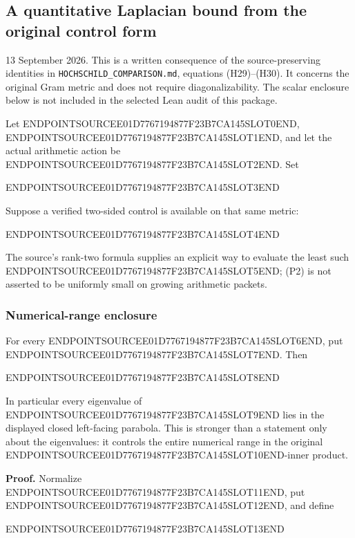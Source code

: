 \subsection{A quantitative Laplacian bound from the original control form}\label{endpoint-cc_laplacian--a-quantitative-laplacian-bound-from-the-original-control-form}

13 September 2026. This is a written consequence of the source-preserving identities in \texttt{HOCHSCHILD\_COMPARISON.md}, equations (H29)--(H30). It concerns the original Gram metric and does not require diagonalizability. The scalar enclosure below is not included in the selected Lean audit of this package.

Let ENDPOINTSOURCEE01D7767194877F23B7CA145SLOT0END, ENDPOINTSOURCEE01D7767194877F23B7CA145SLOT1END, and let the actual arithmetic action be ENDPOINTSOURCEE01D7767194877F23B7CA145SLOT2END. Set

ENDPOINTSOURCEE01D7767194877F23B7CA145SLOT3END

Suppose a verified two-sided control is available on that same metric:

ENDPOINTSOURCEE01D7767194877F23B7CA145SLOT4END

The source's rank-two formula supplies an explicit way to evaluate the least such ENDPOINTSOURCEE01D7767194877F23B7CA145SLOT5END; (P2) is not asserted to be uniformly small on growing arithmetic packets.

\subsubsection{Numerical-range enclosure}\label{endpoint-cc_laplacian--numerical-range-enclosure}

For every ENDPOINTSOURCEE01D7767194877F23B7CA145SLOT6END, put ENDPOINTSOURCEE01D7767194877F23B7CA145SLOT7END. Then

ENDPOINTSOURCEE01D7767194877F23B7CA145SLOT8END

In particular every eigenvalue of ENDPOINTSOURCEE01D7767194877F23B7CA145SLOT9END lies in the displayed closed left-facing parabola. This is stronger than a statement only about the eigenvalues: it controls the entire numerical range in the original ENDPOINTSOURCEE01D7767194877F23B7CA145SLOT10END-inner product.

\textbf{Proof.} Normalize ENDPOINTSOURCEE01D7767194877F23B7CA145SLOT11END, put ENDPOINTSOURCEE01D7767194877F23B7CA145SLOT12END, and define

ENDPOINTSOURCEE01D7767194877F23B7CA145SLOT13END

